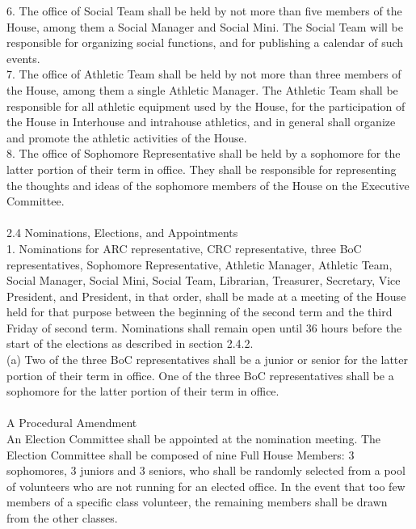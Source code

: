 \documentclass[10pt]{article} %
\begin{document}
\begin{itemize}
        6. The office of Social Team shall be held by not more than five members of the House, among them a Social Manager and Social Mini. The Social Team will be responsible for organizing social functions, and for publishing a calendar of such events. \\
        7. The office of Athletic Team shall be held by not more than three members of the House, among them a single Athletic Manager. The Athletic Team shall be responsible for all athletic equipment used by the House, for the participation of the House in Interhouse and intrahouse athletics, and in general shall organize and promote the athletic activities of the House. \\
        8. The office of Sophomore Representative shall be held by a sophomore for the latter portion of their term in office. They shall be responsible for representing the thoughts and ideas of the sophomore members of the House on the Executive Committee. \\ \\
        2.4 Nominations, Elections, and Appointments \\
        1. Nominations for ARC representative, CRC representative, three BoC representatives, Sophomore Representative, Athletic Manager, Athletic Team, Social Manager, Social Mini, Social Team, Librarian, Treasurer, Secretary, Vice President, and President, in that order, shall be made at a meeting of the House held for that purpose between the beginning of the second term and the third Friday of second term. Nominations shall remain open until 36 hours before the start of the elections as described in section 2.4.2. \\
        (a) Two of the three BoC representatives shall be a junior or senior for the latter portion of their term in office. One of the three BoC representatives shall be a sophomore for the latter portion of their term in office.
        \\ \\
        A Procedural Amendment \\
        An Election Committee shall be appointed at the nomination meeting. The Election Committee shall be composed of nine Full House Members: 3 sophomores, 3 juniors and 3 seniors, who shall be randomly selected from a pool of volunteers who are not running for an elected office. In the event that too few members of a specific class volunteer, the remaining members shall be drawn from the other classes.


\end{itemize}
\end{document}
